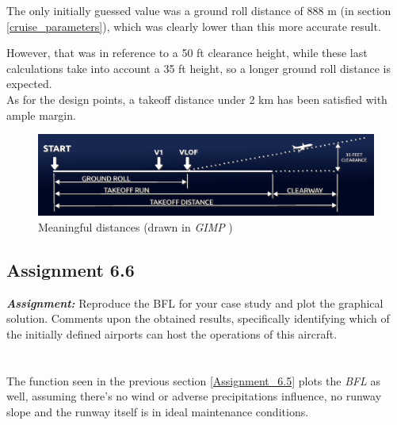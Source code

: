 \documentclass{article}
\begin{document}
The only initially guessed value was a ground roll distance of 888 m (in section \ref{cruise_parameters}), which was clearly lower than this more accurate result.

However, that was in reference to a 50 ft clearance height, while these last calculations take into account a 35 ft height, so a longer
ground roll distance is expected. \\ 

As for the design points, a takeoff distance under 2 km has been satisfied with ample margin.

\begin{figure}[h!]
    \centering
    \includegraphics[width=\textwidth]{Sources/Plots_and_Pictures/distances_diagram.png}
    \caption{Meaningful distances (drawn in \textit{GIMP} \autocite{GIMP})}
    \label{distances}
\end{figure}

\clearpage






\subsection{Assignment 6.6\label{Assignment_6.6}}

\textbf{\textit{Assignment:}} Reproduce the BFL for your case study and plot the graphical solution. 
Comments upon the obtained results, specifically identifying which of the initially 
defined airports can host the operations of this aircraft. \\ \\ \\ 

The function seen in the previous section \ref{Assignment_6.5} plots the \textit{BFL} as well, assuming
there's no wind or adverse precipitations influence, no runway slope and the runway itself is in ideal maintenance conditions. \\ 
\end{document}
